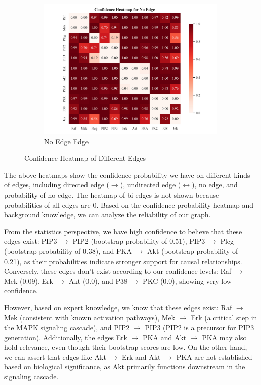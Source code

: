 \documentclass{article}
\begin{document}
\begin{figure}[H]
\begin{subfigure}{0.32\textwidth}
        \centering
        \includegraphics[width=\linewidth]{./demo_data/20241104_135804/sachs/output_graph/non_existence_confidence_heatmap.jpg}
        \caption{No Edge Edge}
\end{subfigure}
\caption{Confidence Heatmap of Different Edges}
\end{figure}        
The above heatmaps show the confidence probability we have on different kinds of edges, including directed edge ($\rightarrow$), undirected edge ($\leftrightarrow$), no edge, and probability of no edge. The heatmap of bi-edges is not shown because probabilities of all edges are 0. Based on the confidence probability heatmap and background knowledge, we can analyze the reliability of our graph.

From the statistics perspective, we have high confidence to believe that these edges exist: PIP3 $\rightarrow$ PIP2 (bootstrap probability of 0.51), PIP3 $\rightarrow$ Plcg (bootstrap probability of 0.38), and PKA $\rightarrow$ Akt (bootstrap probability of 0.21), as their probabilities indicate stronger support for causal relationships. Conversely, these edges don't exist according to our confidence levels: Raf $\rightarrow$ Mek (0.09), Erk $\rightarrow$ Akt (0.0), and P38 $\rightarrow$ PKC (0.0), showing very low confidence.

However, based on expert knowledge, we know that these edges exist: Raf $\rightarrow$ Mek (consistent with known activation pathways), Mek $\rightarrow$ Erk (a critical step in the MAPK signaling cascade), and PIP2 $\rightarrow$ PIP3 (PIP2 is a precursor for PIP3 generation). Additionally, the edges Erk $\rightarrow$ PKA and Akt $\rightarrow$ PKA may also hold relevance, even though their bootstrap scores are low. On the other hand, we can assert that edges like Akt $\rightarrow$ Erk and Akt $\rightarrow$ PKA are not established based on biological significance, as Akt primarily functions downstream in the signaling cascade.
\end{document}
